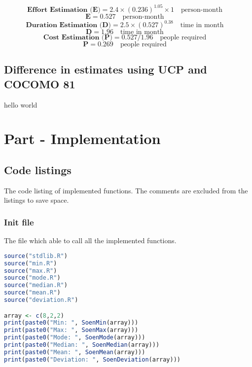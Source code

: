 \documentclass[12pt]{article}
\begin{document}
\begin{equation}
    \textbf{Effort Estimation (E)} = 2.4\times (0.236)^{1.05}\times 1 \quad \textrm{person-month} \quad
\end{equation}
\begin{equation}
    \textbf{E} = 0.527 \quad \textrm{person-month} \quad
\end{equation}
\begin{equation}
    \textbf{Duration Estimation (D)} = 2.5\times (0.527)^{0.38} \quad \textrm{time in month} \quad
\end{equation}
\begin{equation}
    \textbf{D} = 1.96 \quad \textrm{time in month} \quad
\end{equation}
\begin{equation}
    \textbf{Cost Estimation (P)} = 0.527/1.96 \quad \textrm{people required} \quad
\end{equation}
\begin{equation}
    \textbf{P} = 0.269 \quad \textrm{people required} \quad
\end{equation}

\subsection{Difference in estimates using UCP and COCOMO 81}
hello world
\newpage
\section{Part - Implementation}
\subsection{Code listings}
The code listing of implemented functions. The comments are excluded from the listings to save space. 
\subsubsection{Init file}
The file which able to call all the implemented functions.
\begin{lstlisting}[language=R]
source("stdlib.R")
source("min.R")
source("max.R")
source("mode.R")
source("median.R")
source("mean.R")
source("deviation.R")

array <- c(8,2,2)
print(paste0("Min: ", SoenMin(array)))
print(paste0("Max: ", SoenMax(array)))
print(paste0("Mode: ", SoenMode(array)))
print(paste0("Median: ", SoenMedian(array)))
print(paste0("Mean: ", SoenMean(array)))
print(paste0("Deviation: ", SoenDeviation(array)))
\end{lstlisting}
\end{document}
